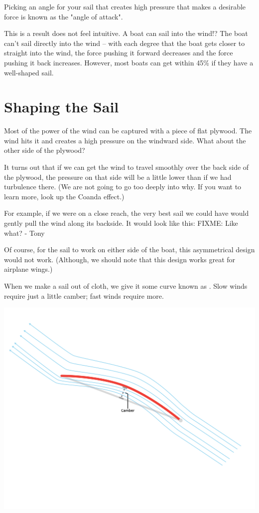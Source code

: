Picking an angle for your sail that creates high pressure that makes a desirable force is known as the "angle of attack".

This is a result does not feel intuitive. A boat can sail into the wind!? The boat can't sail directly into the wind -- with each degree that the boat gets closer
to straight into the wind,  the force pushing it forward decreases and the force pushing it back increases. However,  most boats can get within 45\% if they have a well-shaped sail.

\section{Shaping the Sail}

Most of the power of the wind can be captured with a piece of flat plywood.  The wind hits it and creates a high pressure on the windward side. What about the other side of the plywood?

It turns out that if we can get the wind to travel smoothly over the back side of the plywood,   the pressure on that side will be a little lower than if we had turbulence there.   (We are not going
to go too deeply into why. If you want to learn more, look up the Coanda effect.)

For example, if we were on a close reach, the very best sail we could have would gently pull the wind along its backside.  It would look like this:
FIXME: Like what? - Tony

Of course, for the sail to work on either side of the boat,  this asymmetrical design would not work.  (Although,  we should note that this design works great
for airplane wings.)

When we make a sail out of cloth,  we give it some curve known as .  Slow winds require just a little camber;  fast winds require more.

\begin{center}
    \includegraphics[width=.75\textwidth]{camber.png}
    
\end{center}

